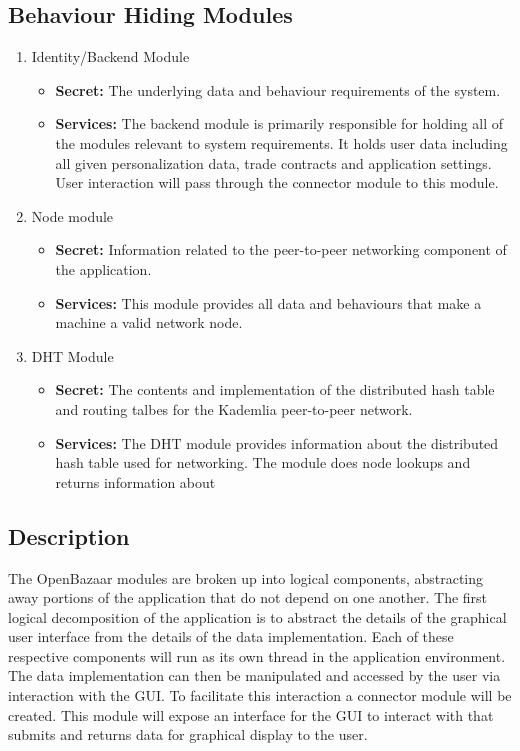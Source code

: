 \documentclass{article}
\begin{document}
\subsection{Behaviour Hiding Modules}
\begin{enumerate}
\item
Identity/Backend Module
\begin{itemize}
\item
\textbf{Secret:} The underlying data and behaviour requirements of the system.

\item
\textbf{Services:} The backend module is primarily responsible for holding all of the modules relevant to system requirements. It holds user data including all given personalization data, trade contracts and application settings. User interaction will pass through the connector module to this module.
\end{itemize}

\item
Node module
\begin{itemize}
\item
\textbf{Secret:} Information related to the peer-to-peer networking component of the application.

\item
\textbf{Services:} This module provides all data and behaviours that make a machine a valid network node.
\end{itemize}

\item
DHT Module
\begin{itemize}
\item
\textbf{Secret:} The contents and implementation of the distributed hash table and routing talbes for the Kademlia peer-to-peer network.

\item
\textbf{Services:} The DHT module provides information about the distributed hash table used for networking. The module does node lookups and returns information about 
\end{itemize}
\end{enumerate}

\subsection*{Description}
The OpenBazaar modules are broken up into logical components, abstracting away portions of the application that do not depend on one another. The first logical decomposition of the application is to abstract the details of the graphical user interface from the details of the data implementation. Each of these respective components will run as its own thread in the application environment. The data implementation can then be manipulated and accessed by the user via interaction with the GUI. To facilitate this interaction a connector module will be created. This module will expose an interface for the GUI to interact with that submits and returns data for graphical display to the user.
\end{document}
